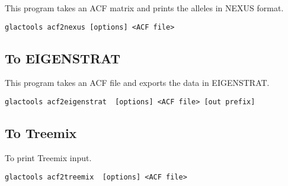 \documentclass[a4paper]{article}
\begin{document}
\noindent This program takes an ACF matrix and prints the alleles in NEXUS format.

\begin{lstlisting}
glactools acf2nexus [options] <ACF file> 
\end{lstlisting}

\subsection{To EIGENSTRAT}
\noindent This program takes an ACF file and exports the data in EIGENSTRAT.
\tiny
\begin{lstlisting}
glactools acf2eigenstrat  [options] <ACF file> [out prefix]
\end{lstlisting}
\normalsize

\subsection{To Treemix}

To print Treemix input.
\begin{lstlisting}
glactools acf2treemix  [options] <ACF file>
\end{lstlisting}










\newpage





%

\end{document}
